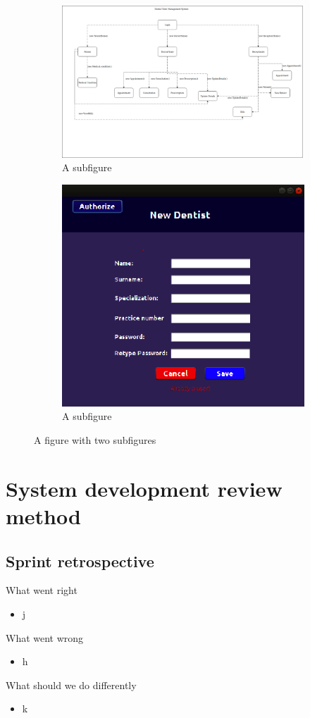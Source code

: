 \documentclass[11 pt]{article}
\begin{document}
    \begin{figure}
\centering
\begin{subfigure}{.8\textwidth}
  \centering
  \includegraphics[width=0.4\linewidth]{Logical_view.png}
  \caption{A subfigure}
  \label{fig:sub1}
\end{subfigure}%
\begin{subfigure}{.5\textwidth}
  \centering
  \includegraphics[width=.8\linewidth]{new dentist.png}
  \caption{A subfigure}
  \label{fig:sub2}
\end{subfigure}
\caption{A figure with two subfigures}
\label{fig:test}
\end{figure}
\clearpage
\newpage
\section{System development review method} 
\subsection{Sprint retrospective}
What went right 
\begin{itemize}
\item j

\end{itemize}
What went wrong
\begin{itemize}
\item h

\end{itemize}
What should we do differently
\begin{itemize}
\item k
\end{itemize}
\end{document}

